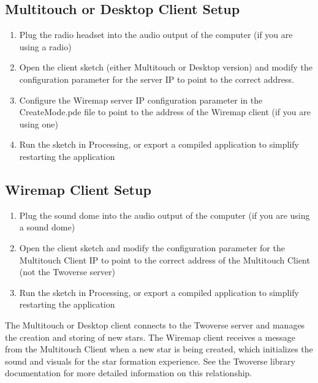 \subsection{Multitouch or Desktop Client Setup}
\begin{enumerate}
\item Plug the radio headset into the audio output of the computer (if you are using a radio)
\item Open the client sketch (either Multitouch or Desktop version) and modify the configuration parameter for the server IP to point to the correct address.
\item Configure the Wiremap server IP configuration parameter in the CreateMode.pde file to point to the address of the Wiremap client (if you are using one)
\item Run the sketch in Processing, or export a compiled application to simplify restarting the application
\end{enumerate}

\subsection{Wiremap Client Setup}
\begin{enumerate}
\item Plug the sound dome into the audio output of the computer (if you are using a sound dome)
\item Open the client sketch and modify the configuration parameter for the Multitouch Client IP to point to the correct address of the Multitouch Client (not the Twoverse server)
\item Run the sketch in Processing, or export a compiled application to simplify restarting the application
\end{enumerate}


The Multitouch or Desktop client connects to the Twoverse server and manages the creation and storing of new stars. The Wiremap client receives a message from the Multitouch Client when a new star is being created, which initializes the sound and visuals for the star formation experience. See the Twoverse library documentation for more detailed information on this relationship.
